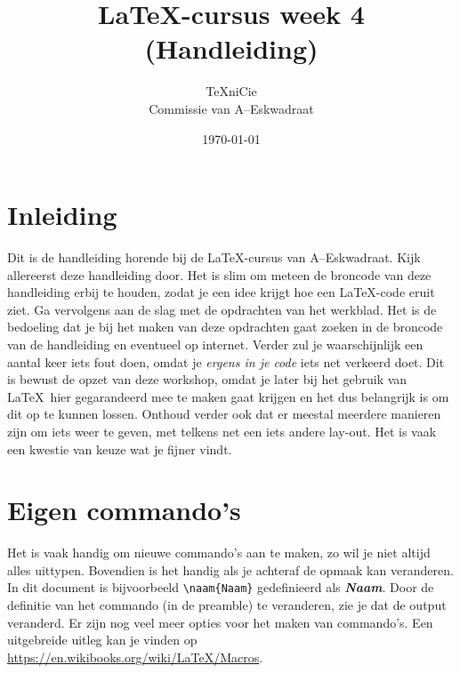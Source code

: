 \documentclass{article}
\newcommand{\naam}[1]{{\bf\emph{#1}}} %
\begin{document}
\title{\LaTeX-cursus week 4 (Handleiding)}
\author{\TeX niCie \\[1mm] Commissie van \mbox{A--Es}kwadraat}
\date{\today} %

\maketitle %

\tableofcontents %

\newpage %

\section{Inleiding} %
Dit is de handleiding horende bij de \LaTeX -cursus van \mbox{A--Es}kwadraat. Kijk allereerst deze handleiding door. Het is slim om meteen de broncode van deze handleiding erbij te houden, zodat je een idee krijgt hoe een \LaTeX -code eruit ziet. Ga vervolgens aan de slag met de opdrachten van het werkblad. Het is de bedoeling dat je bij het maken van deze opdrachten gaat zoeken in de broncode van de handleiding en eventueel op internet. Verder zul je waarschijnlijk een aantal keer iets fout doen, omdat je \emph{ergens in je code} iets net verkeerd doet. Dit is bewust de opzet van deze workshop, omdat je later bij het gebruik van \LaTeX\ hier gegarandeerd mee te maken gaat krijgen en het dus belangrijk is om dit op te kunnen lossen. Onthoud verder ook dat er meestal meerdere manieren zijn om iets weer te geven, met telkens net een iets andere lay-out. Het is vaak een kwestie van keuze wat je fijner vindt.

\section{Eigen commando's} %
Het is vaak handig om nieuwe commando's aan te maken, zo wil je niet altijd alles uittypen. Bovendien is het handig als je achteraf de opmaak kan veranderen. In dit document is bijvoorbeeld \verb+\naam{Naam}+ gedefinieerd als \naam{Naam}. Door de definitie van het commando (in de preamble) te veranderen, zie je dat de output veranderd.
Er zijn nog veel meer opties voor het maken van commando's. Een uitgebreide uitleg kan je vinden op \url{https://en.wikibooks.org/wiki/LaTeX/Macros}. \bigbreak
\end{document}
